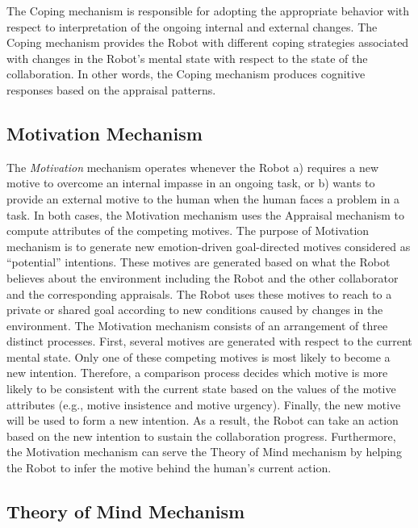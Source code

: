 The Coping mechanism is responsible for adopting the appropriate behavior with
respect to interpretation of the ongoing internal and external changes. The
Coping mechanism provides the Robot with different coping strategies associated
with changes in the Robot's mental state with respect to the state of the
collaboration. In other words, the Coping mechanism produces cognitive responses
based on the appraisal patterns.

\subsection{Motivation Mechanism}
\label{sec:motivation-mech}

The \textit{Motivation} mechanism operates whenever the Robot a) requires a new
motive to overcome an internal impasse in an ongoing task, or b) wants to
provide an external motive to the human when the human faces a problem in a
task. In both cases, the Motivation mechanism uses the Appraisal mechanism to
compute attributes of the competing motives. The purpose of Motivation mechanism
is to generate new emotion-driven goal-directed motives considered as
``potential'' intentions. These motives are generated based on what the Robot
believes about the environment including the Robot and the other collaborator
and the corresponding appraisals. The Robot uses these motives to reach to a
private or shared goal according to new conditions caused by changes in the
environment. The Motivation mechanism consists of an arrangement of three
distinct processes. First, several motives are generated with respect to the
current mental state. Only one of these competing motives is most likely to
become a new intention. Therefore, a comparison process decides which motive is
more likely to be consistent with the current state based on the values of the
motive attributes (e.g., motive insistence and motive urgency). Finally, the new
motive will be used to form a new intention. As a result, the Robot can take an
action based on the new intention to sustain the collaboration progress.
Furthermore, the Motivation mechanism can serve the Theory of Mind mechanism by
helping the Robot to infer the motive behind the human's current action.

\subsection{Theory of Mind Mechanism}
\label{sec:tom-mech}

